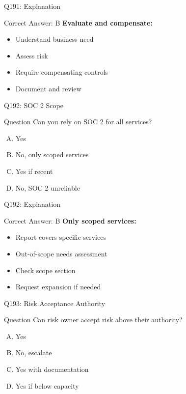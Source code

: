 \documentclass{beamer}
\begin{document}
	\begin{frame}{Q191: Explanation}
		\begin{block}{Correct Answer: B}
			\textbf{Evaluate and compensate:}
			\begin{itemize}
				\item Understand business need
				\item Assess risk
				\item Require compensating controls
				\item Document and review
			\end{itemize}
		\end{block}
	\end{frame}
	
	\begin{frame}{Q192: SOC 2 Scope}
		\begin{block}{Question}
			Can you rely on SOC 2 for all services?
		\end{block}
		\begin{enumerate}[(A)]
			\item Yes
			\item No, only scoped services
			\item Yes if recent
			\item No, SOC 2 unreliable
		\end{enumerate}
	\end{frame}
	
	\begin{frame}{Q192: Explanation}
		\begin{block}{Correct Answer: B}
			\textbf{Only scoped services:}
			\begin{itemize}
				\item Report covers specific services
				\item Out-of-scope needs assessment
				\item Check scope section
				\item Request expansion if needed
			\end{itemize}
		\end{block}
	\end{frame}
	
	\begin{frame}{Q193: Risk Acceptance Authority}
		\begin{block}{Question}
			Can risk owner accept risk above their authority?
		\end{block}
		\begin{enumerate}[(A)]
			\item Yes
			\item No, escalate
			\item Yes with documentation
			\item Yes if below capacity
		\end{enumerate}
	\end{frame}
	
\end{document}
